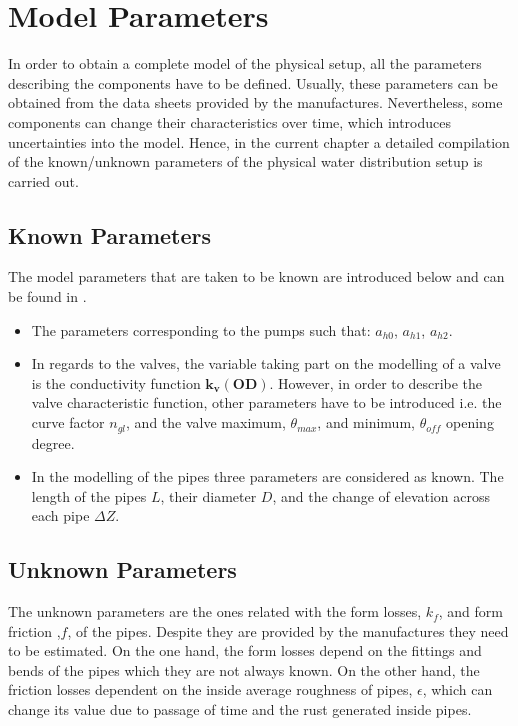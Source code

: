 \section{Model Parameters}
\label{estimateParameters}
In order to obtain a complete model of the physical setup, all the parameters describing the components have to be defined. Usually, these parameters can be 
obtained from the data sheets provided by the manufactures. Nevertheless, some components can change their characteristics over time, which introduces uncertainties 
into the model. Hence, in the current chapter a detailed compilation of the known/unknown parameters of the physical water distribution setup is carried out.

\subsection{Known Parameters}

The model parameters that are taken to be known are introduced below and can be found in .


\begin{itemize}
  \item The parameters corresponding to the pumps such that: $a_{h0}$, $a_{h1}$, $a_{h2}$. %
  
  \item In regards to the valves, the variable taking part on the modelling of a valve is the conductivity function $\pmb{k_v(OD)}$. However, in 
  order to describe the valve characteristic function, other parameters have to be introduced i.e. the curve factor $n_{gl}$, and the 
  valve maximum, $\theta_{max}$, and minimum, $\theta_{off}$ opening degree.
  
  \item In the modelling of the pipes three parameters are considered as known. The length of the pipes $L$, their diameter $D$, and the change of 
  elevation across each pipe $\Delta Z$.  
\end{itemize} 

\subsection{Unknown Parameters}
The unknown parameters are the ones related with the form losses, $k_f$, and form friction ,$f$, of the pipes. Despite they are 
provided by the manufactures they need to be estimated. On the one hand, the form losses depend on the fittings and bends of the pipes which they are not always known. 
On the other hand, the friction losses dependent on the inside average roughness of pipes, $\epsilon$, which can change its value due to passage of time 
and the rust generated inside pipes. 

